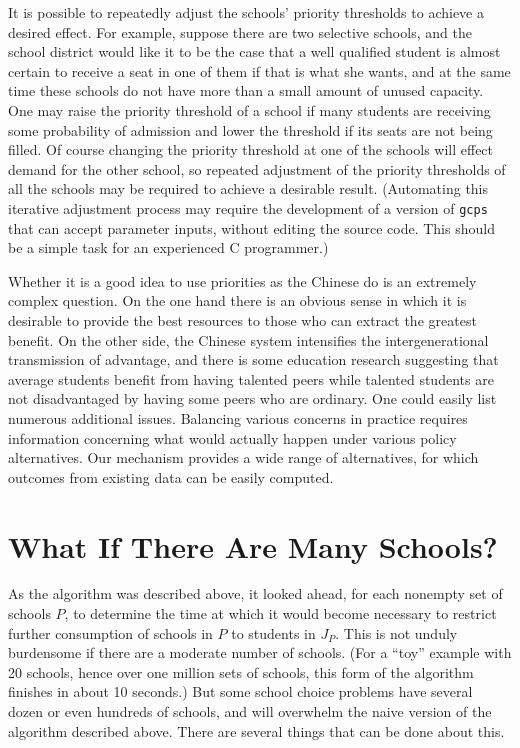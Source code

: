 \documentclass[12pt]{article}
\theoremstyle{definition}
\begin{document}
It is possible to repeatedly adjust the schools' priority thresholds
to achieve a desired effect.  For example, suppose there are two
selective schools, and the school district would like it to be the
case that a well qualified student is almost certain to receive a seat
in one of them if that is what she wants, and at the same time these
schools do not have more than a small amount of unused capacity.  One
may raise the priority threshold of a school if many students are
receiving some probability of admission and lower the threshold if its
seats are not being filled.  Of course changing the priority threshold
at one of the schools will effect demand for the other school, so
repeated adjustment of the priority thresholds of all the schools may
be required to achieve a desirable result.  (Automating this iterative
adjustment process may require the development of a version of
\texttt{gcps} that can accept parameter inputs, without editing the
source code.  This should be a simple task for an experienced C
programmer.)

Whether it is a good idea to use priorities as the Chinese do is an
extremely complex question.  On the one hand there is an obvious sense
in which it is desirable to provide the best resources to those who
can extract the greatest benefit.  On the other side, the Chinese
system intensifies the intergenerational transmission of advantage,
and there is some education research suggesting that average students
benefit from having talented peers while talented students are not
disadvantaged by having some peers who are ordinary. One could easily
list numerous additional issues.  Balancing various concerns in
practice requires information concerning what would actually happen
under various policy alternatives.  Our mechanism provides a wide
range of alternatives, for which outcomes from existing data can be
easily computed.

\section{What If There Are Many Schools?} \label{sec:ManySchools}

As the algorithm was described above, it looked ahead, for each
nonempty set of schools $P$, to determine the time at which it would
become necessary to restrict further consumption of schools in $P$ to
students in $J_P$.  This is not unduly burdensome if there are a
moderate number of schools.  (For a ``toy'' example with 20 schools,
hence over one million sets of schools, this form of the algorithm
finishes in about 10 seconds.)  But some school choice problems have
several dozen or even hundreds of schools, and will overwhelm the
naive version of the algorithm described above.  There are several
things that can be done about this.
\end{document}
